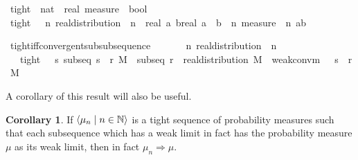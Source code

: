 \documentclass[leqno]{article}
\theoremstyle{definition}
\newtheorem{corollary}[theorem]{Corollary}
\newcommand{\bldseq}[2]{\langle{#1}\mid{#2}\rangle}
\begin{document}
\begin{isabellebody}
\isamarkupfalse%
\ tight\ {\isacharcolon}{\isacharcolon}\ {\isachardoublequoteopen}{\isacharparenleft}nat\ {\isasymRightarrow}\ real\ measure{\isacharparenright}\ {\isasymRightarrow}\ bool{\isachardoublequoteclose}\isanewline
{}\ {\isachardoublequoteopen}tight\ {\isasymmu}\ {\isasymequiv}\ {\isacharparenleft}{\isasymforall}n{\isachardot}\ real{\isacharunderscore}distribution\ {\isacharparenleft}{\isasymmu}\ n{\isacharparenright}{\isacharparenright}\ {\isasymand}\ {\isacharparenleft}{\isasymforall}{\isacharparenleft}{\isasymepsilon}{\isacharcolon}{\isacharcolon}real{\isacharparenright}{\isachargreater}{}{\isachardot}\ {\isasymexists}a\ b{\isacharcolon}{\isacharcolon}real{\isachardot}\ a\ {\isacharless}\ b\ {\isasymand}\ {\isacharparenleft}{\isasymforall}n{\isachardot}\ measure\ {\isacharparenleft}{\isasymmu}\ n{\isacharparenright}\ {\isacharbraceleft}a{\isacharless}{\isachardot}{\isachardot}b{\isacharbraceright}\ {\isachargreater}\ {}\ {\isacharminus}\ {\isasymepsilon}{\isacharparenright}{\isacharparenright}{\isachardoublequoteclose}
\end{isabellebody}

\medskip

\begin{isabellebody}
\isamarkupfalse%
\ tight{\isacharunderscore}iff{\isacharunderscore}convergent{\isacharunderscore}subsubsequence{\isacharcolon}\isanewline
\ \ \ {\isasymmu}\isanewline
\ \ \ {\isachardoublequoteopen}{\isasymAnd}n{\isachardot}\ real{\isacharunderscore}distribution\ {\isacharparenleft}{\isasymmu}\ n{\isacharparenright}{\isachardoublequoteclose}\isanewline
\ \ \ {\isachardoublequoteopen}tight\ {\isasymmu}\ {\isacharequal}\ {\isacharparenleft}{\isasymforall}s{\isachardot}\ subseq\ s\ {\isasymlongrightarrow}\ {\isacharparenleft}{\isasymexists}r{\isachardot}\ {\isasymexists}M{\isachardot}\ \ subseq\ r\ {\isasymand}\ real{\isacharunderscore}distribution\ M\ {\isasymand}\ weak{\isacharunderscore}conv{\isacharunderscore}m\ {\isacharparenleft}{\isasymmu}\ {\isasymcirc}\ s\ {\isasymcirc}\ r{\isacharparenright}\ M{\isacharparenright}{\isacharparenright}{\isachardoublequoteclose}
\end{isabellebody}

\medskip

A corollary of this result will also be useful.

\begin{corollary}
If $\bldseq{\mu_n}{n \in \N}$ is a tight sequence of probability measures such that each subsequence which has a weak limit in fact has the probability measure $\mu$ as its weak limit, then in fact $\mu_n \Rightarrow \mu$.
\end{corollary}
\end{document}
